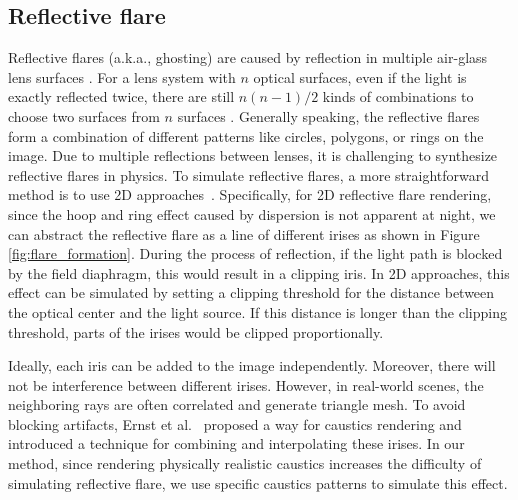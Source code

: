 \documentclass{article}
\newcommand{\yuekun}[1]{{\color{black}{#1}}}
\begin{document}
\vspace{-2mm}
\subsection{Reflective flare} \label{reflective flare}
\vspace{-1mm}
Reflective flares (a.k.a., ghosting) are caused by reflection in multiple air-glass lens surfaces \cite{flare_simulation1}. 
For a lens system with $n$ optical surfaces, even if the light is exactly reflected twice, there are still $n(n-1)/2$ kinds of combinations to choose two surfaces from $n$ surfaces \yuekun{\cite{how_to,flare_simulation1}}. 
Generally speaking, the reflective flares form a combination of different patterns like circles, polygons, or rings on the image. 
Due to multiple reflections between lenses, it is challenging to synthesize reflective flares in physics. 
To simulate reflective flares, a more straightforward method is to use 2D approaches~\cite{flare_simulation2}. 
Specifically, for 2D reflective flare rendering, since the hoop and ring effect caused by dispersion is not apparent at night, we can abstract the reflective flare as a line of different irises as shown in Figure \ref{fig:flare_formation}.
During the process of reflection, if the light path is blocked by the field diaphragm, this would result in a clipping iris. 
In 2D approaches, this effect can be simulated by setting a clipping threshold for the distance between the optical center and the light source. 
If this distance is longer than the clipping threshold, parts of the irises would be clipped proportionally.

Ideally, each iris can be added to the image independently. Moreover, there will not be interference between different irises.
However, in real-world scenes, the neighboring rays are often correlated and generate triangle mesh. 
To avoid blocking artifacts, Ernst et al.~\cite{Ernst2005} proposed a way for caustics rendering and introduced a technique for combining and interpolating these irises. 
In our method, since rendering physically realistic caustics increases the difficulty of simulating reflective flare, we use specific caustics patterns to simulate this effect.
\end{document}
